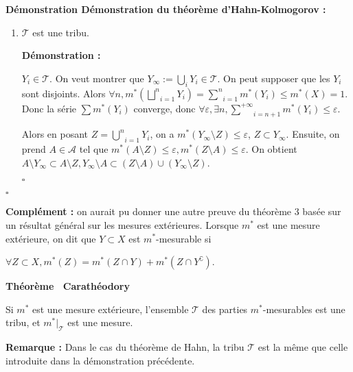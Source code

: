 \documentclass[10pt,a4paper,notitlepage ]{report}
\newcommand{\1}{\mathds 1}
\newcommand{\comp}[1]{#1^\complement}
\newcounter{th}
\newenvironment{theorem}[1][]{
\refstepcounter{th}
\begin{tcolorbox}
	\textbf{Théorème \theth \ #1}
	
	
}{\end{tcolorbox}}
\newenvironment{demo}[1][]{

	\textbf{Démonstration #1 :}
}{\begin{flushright}
	$\square$
\end{flushright}
}
\newenvironment{rem}{
	
		\textbf{Remarque :}}{}
\begin{document}
\begin{demo}[Démonstration du théorème d'Hahn-Kolmogorov]
\begin{enumerate}
\begin{demo}
			Finalement, $m^*(Y) + m^*(Z) \le m^*(Y \cup Z) + 6\varepsilon$ 
		\end{demo}
	Comme $m^*$ est une mesure extérieure et une mesure additive sur l'algèbre $\mathcal T$, elle a la propriété de $\sigma$-additivité.
	\item $\mathcal T$ est une tribu.
	\begin{demo}
		$Y_i \in \mathcal T$. On veut montrer que $Y_\infty := \underset i \bigcup Y_i \in \mathcal T$. On peut supposer que les $Y_i$ sont disjoints. Alors $\forall n, m^*(\underset{i = 1}{\overset{n} \bigsqcup} Y_i) = \underset{i = 1}{\overset{n} \sum} m^*(Y_i) \le m^*(X) = 1$. Donc la série $\sum m^*(Y_i)$ converge, donc $\forall \varepsilon, \exists n, \underset{i = n+1}{\overset{+\infty} \sum} m^*(Y_i) \le \varepsilon$.
					
		Alors en posant $Z= \underset{i = 1}{\overset{n} \bigcup} Y_i$, on a $m^*(Y_\infty \setminus Z) \le \varepsilon$, $Z \subset Y_\infty$. Ensuite, on prend $A \in \mathcal A$ tel que $m^*(A\setminus Z) \le \varepsilon, m^*(Z\setminus A) \le \varepsilon$. On obtient $A \setminus Y_\infty \subset A \setminus Z, Y_\infty \setminus A \subset (Z \setminus A) \cup (Y_\infty \setminus Z)$.
	\end{demo}
	\end{enumerate}
\end{demo}

\textbf{Complément :} on aurait pu donner une autre preuve du théorème 3 basée sur un résultat général sur les mesures extérieures. Lorsque $m^*$ est une mesure extérieure, on dit que $Y \subset X$ est $m^*$-mesurable si

$\forall Z \subset X, m^*(Z) = m^*(Z \cap Y) + m^*(Z \cap \comp Y)$.

\begin{theorem}[Carathéodory]
	Si $m^*$ est une mesure extérieure, l'ensemble $\mathcal T$ des parties $m^*$-mesurables est une tribu, et $m^*|_{\mathcal T}$ est une mesure.
\end{theorem}
\begin{rem}
	Dans le cas du théorème de Hahn, la tribu $\mathcal T$ est la même que celle introduite dans la démonstration précédente.
\end{rem}
\end{document}
